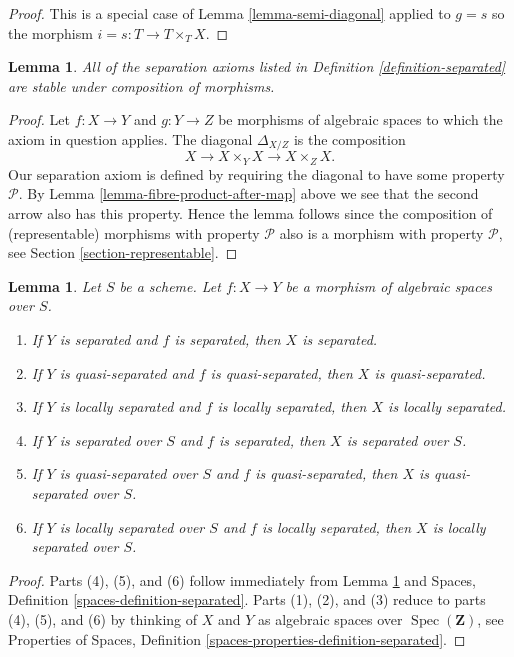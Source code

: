 \documentclass{stacks-project}
\theoremstyle{plain}
\newtheorem{lemma}[subsection]{Lemma}
\theoremstyle{definition}
\theoremstyle{remark}
\numberwithin{equation}{subsection}
\def\Spec{\mathop{\mathrm{Spec}}}
\begin{document}
\begin{proof}
This is a special case of Lemma \ref{lemma-semi-diagonal} applied to
$g = s$ so the morphism $i = s : T \to T \times_T X$.
\end{proof}

\begin{lemma}
\label{lemma-composition-separated}
All of the separation axioms listed in Definition \ref{definition-separated}
are stable under composition of morphisms.
\end{lemma}

\begin{proof}
Let $f : X \to Y$ and $g : Y \to Z$ be morphisms of algebraic spaces
to which the axiom in question applies.
The diagonal $\Delta_{X/Z}$ is the composition
$$
X \longrightarrow X \times_Y X \longrightarrow X \times_Z X.
$$
Our separation axiom is defined by requiring the diagonal
to have some property $\mathcal{P}$. By
Lemma \ref{lemma-fibre-product-after-map} above we see that
the second arrow also has this property. Hence the lemma follows
since the composition of (representable) morphisms with property
$\mathcal{P}$ also is a morphism with property $\mathcal{P}$, see
Section \ref{section-representable}.
\end{proof}

\begin{lemma}
\label{lemma-separated-over-separated}
Let $S$ be a scheme.
Let $f : X \to Y$ be a morphism of algebraic spaces over $S$.
\begin{enumerate}
\item If $Y$ is separated and $f$ is separated, then $X$ is separated.
\item If $Y$ is quasi-separated and $f$ is quasi-separated, then
$X$ is quasi-separated.
\item If $Y$ is locally separated and $f$ is locally separated, then
$X$ is locally separated.
\item If $Y$ is separated over $S$ and $f$ is separated, then
$X$ is separated over $S$.
\item If $Y$ is quasi-separated over $S$ and $f$ is quasi-separated, then
$X$ is quasi-separated over $S$.
\item If $Y$ is locally separated over $S$ and $f$ is locally separated, then
$X$ is locally separated over $S$.
\end{enumerate}
\end{lemma}

\begin{proof}
Parts (4), (5), and (6) follow immediately from
Lemma \ref{lemma-composition-separated}
and
Spaces, Definition \ref{spaces-definition-separated}.
Parts (1), (2), and (3) reduce to parts (4), (5), and (6) by thinking
of $X$ and $Y$ as algebraic spaces over $\Spec(\mathbf{Z})$, see
Properties of Spaces, Definition \ref{spaces-properties-definition-separated}.
\end{proof}
\end{document}
